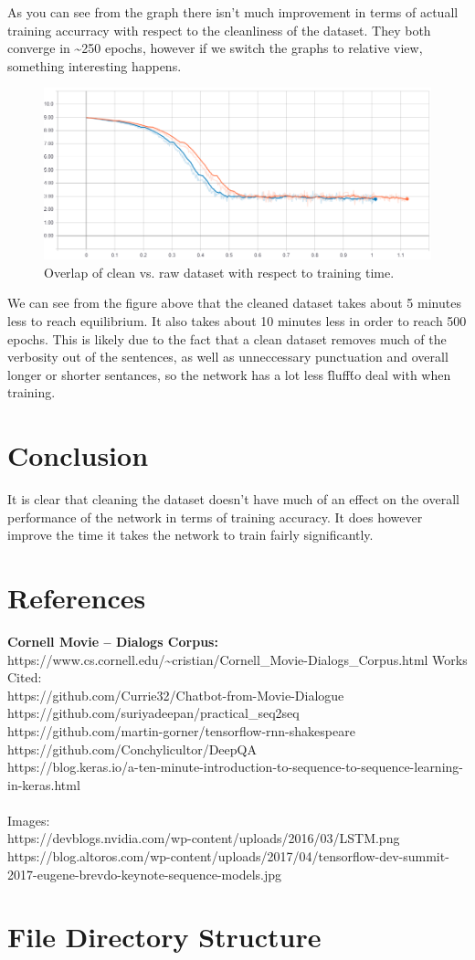 \documentclass[titlepage]{article}
\begin{document}
As you can see from the graph there isn't much improvement in terms of actuall training accurracy with respect to the cleanliness of the dataset. They both converge in \textasciitilde 250 epochs, however if we switch the graphs to relative view, something interesting happens.
\begin{figure}[H]
	\centering
	\includegraphics[width=120mm]{cost-overlap-relative-001.png}
	\caption{Overlap of clean vs. raw dataset with respect to training time.}
	\label{fig:cor001}
\end{figure} 
We can see from the figure above that the cleaned dataset takes about 5 minutes less to reach equilibrium. It also takes about 10 minutes less in order to reach 500 epochs. This is likely due to the fact that a clean dataset removes much of the verbosity out of the sentences, as well as unneccessary punctuation and overall longer or shorter sentances, so the network has a lot less \'fluff\' to deal with when training. 

\section{Conclusion}
It is clear that cleaning the dataset doesn't have much of an effect on the overall performance of the network in terms of training accuracy. It does however improve the time it takes the network to train fairly significantly.

\section{References}
\textbf{Cornell Movie -- Dialogs Corpus: } https://www.cs.cornell.edu/\textasciitilde cristian/Cornell\_Movie-Dialogs\_Corpus.html
\large{Works Cited:}
\small{
\\https://github.com/Currie32/Chatbot-from-Movie-Dialogue
\\https://github.com/suriyadeepan/practical\_seq2seq
\\https://github.com/martin-gorner/tensorflow-rnn-shakespeare 
\\https://github.com/Conchylicultor/DeepQA
\\https://blog.keras.io/a-ten-minute-introduction-to-sequence-to-sequence-learning-in-keras.html
}
~\\~\\
\large{Images:}
\small{
\\https://devblogs.nvidia.com/wp-content/uploads/2016/03/LSTM.png
\\https://blog.altoros.com/wp-content/uploads/2017/04/tensorflow-dev-summit-2017-eugene-brevdo-keynote-sequence-models.jpg
}

\section{File Directory Structure}
\end{document}
